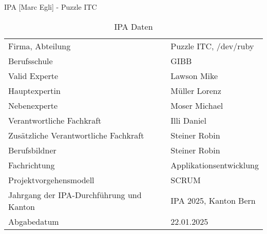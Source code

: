 \begin{titlepage}
  \Huge IPA [Marc Egli] - Puzzle ITC \normalsize
\bigbreak
\begin{table}[h!]
    \begin{tabular}{|L{0.4\textwidth}|L{0.5\textwidth}|}
        \hline
          \\[12pt]
        \hline
        Firma, Abteilung & Puzzle ITC, /dev/ruby \\
        \hline
        Berufsschule & GIBB \\
        \hline
        Valid Experte & Lawson Mike \\ 
        \hline
        Hauptexpertin & Müller Lorenz \\
        \hline
        Nebenexperte & Moser Michael \\
        \hline
        Verantwortliche Fachkraft & Illi Daniel \\
        \hline
        Zusätzliche Verantwortliche Fachkraft & Steiner Robin \\
        \hline
        Berufsbildner & Steiner Robin \\
        \hline
        Fachrichtung & Applikationsentwicklung \\
        \hline
        Projektvorgehensmodell & SCRUM \\
        \hline
        Jahrgang der IPA-Durchführung und Kanton &  IPA 2025, Kanton Bern \\
        \hline
        Abgabedatum & 22.01.2025\\
        \hline
      \end{tabular}
      \caption{IPA Daten}
\end{table}
\end{titlepage}